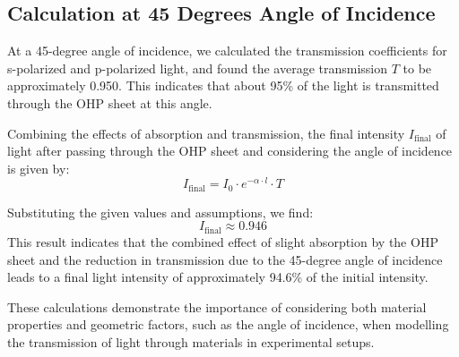 \subsection*{Calculation at 45 Degrees Angle of Incidence}
At a 45-degree angle of incidence, we calculated the transmission coefficients for s-polarized and p-polarized light, and found the average transmission \(T\) to be approximately 0.950. This indicates that about 95\% of the light is transmitted through the OHP sheet at this angle.

Combining the effects of absorption and transmission, the final intensity \(I_{\text{final}}\) of light after passing through the OHP sheet and considering the angle of incidence is given by:
\[ I_{\text{final}} = I_0 \cdot e^{-\alpha \cdot l} \cdot T \]

Substituting the given values and assumptions, we find:
\[ I_{\text{final}} \approx 0.946 \]
This result indicates that the combined effect of slight absorption by the OHP sheet and the reduction in transmission due to the 45-degree angle of incidence leads to a final light intensity of approximately 94.6\% of the initial intensity.

These calculations demonstrate the importance of considering both material properties and geometric factors, such as the angle of incidence, when modelling the transmission of light through materials in experimental setups.



